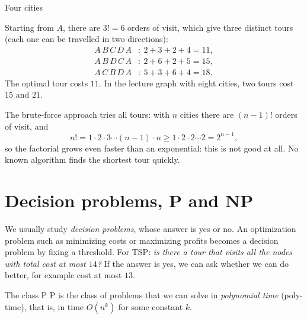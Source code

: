 \documentclass[a4paper,12pt,oneside]{report}
\begin{document}
\begin{framedexample}{Four cities}\label{ex:tsp-four}
\begin{center}
\end{center}
Starting from $A$, there are $3!=6$ orders of visit, which give three
distinct tours (each one can be travelled in two directions):
\begin{align*}
  A\,B\,C\,D\,A&:\ 2+3+2+4=11,\\
  A\,B\,D\,C\,A&:\ 2+6+2+5=15,\\
  A\,C\,B\,D\,A&:\ 5+3+6+4=18.
\end{align*}
The optimal tour costs $11$. In the lecture graph with eight cities,
two tours cost $15$ and $21$.
\end{framedexample}

The brute-force approach tries all tours:
with $n$ cities there are $(n-1)!$ orders of visit, and
\[
  n!=1\cdot2\cdot3\cdots(n-1)\cdot n\geq1\cdot2\cdot2\cdots2=2^{n-1},
\]
so the factorial grows even faster than an exponential: this is not
good at all. No known algorithm finds the shortest tour quickly.

\section{Decision problems, P and NP}

We usually study \emph{decision problems}, whose answer is yes or no.
An optimization problem such as minimizing costs or maximizing profits
becomes a decision problem by fixing a threshold. For TSP: \emph{is
there a tour that visits all the nodes with total cost at most $14$?}
If the answer is yes, we can ask whether we can do better, for example
cost at most $13$.

\begin{frameddefn}{The class P}\label{def:class-p}
$\mathrm{P}$ is the class of problems that we can solve in
\emph{polynomial time} (poly-time), that is, in time $O(n^k)$ for some
constant $k$.
\end{frameddefn}
\end{document}
